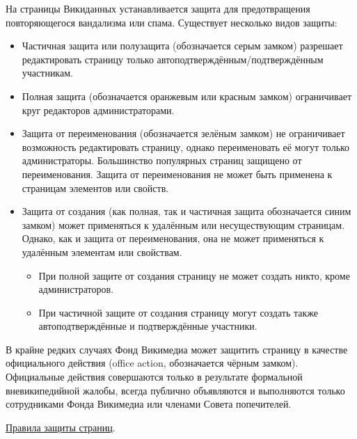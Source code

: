 На страницы Викиданных устанавливается защита для предотвращения повторяющегося вандализма или спама. Существует несколько видов защиты:
\begin{itemize}
  \item Частичная защита или полузащита (обозначается серым замком) разрешает редактировать страницу только автоподтверждённым/подтверждённым участникам.
  \item Полная защита (обозначается оранжевым или красным замком) ограничивает круг редакторов администраторами.
  \item Защита от переименования (обозначается зелёным замком) не ограничивает возможность редактировать страницу, однако переименовать её могут только администраторы. Большинство популярных страниц защищено от переименования. Защита от переименования не может быть применена к страницам элементов или свойств.
  \item Защита от создания (как полная, так и частичная защита обозначается синим замком) может применяться к удалённым или несуществующим страницам. Однако, как и защита от переименования, она не может применяться к удалённым элементам или свойствам.
  \begin{itemize}
	\item При полной защите от создания страницу не может создать никто, кроме администраторов.
	\item При частичной защите от создания страницу могут создать также автоподтверждённые и подтверждённые участники.
  \end{itemize}
\end{itemize}

В крайне редких случаях Фонд Викимедиа может защитить страницу в качестве официального действия (office action, обозначается чёрным замком). Официальные действия совершаются только в результате формальной вневикипедийной жалобы, всегда публично объявляются и выполняются только сотрудниками Фонда Викимедиа или членами Совета попечителей.

\href{https://www.wikidata.org/w/index.php?title=Wikidata:Protection_policy/ru&oldid=1413630638}{Правила защиты страниц}.